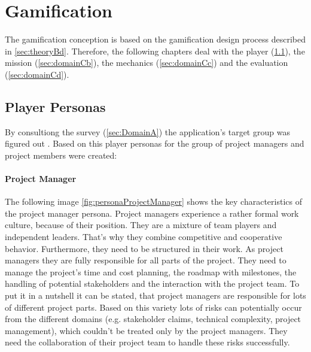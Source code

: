 \newpage

\section{Gamification}
\label{sec:domainC}


The gamification conception is based on the gamification design process described in \ref{sec:theoryBd}. Therefore, the following chapters deal with the player (\ref{sec:domainCa}), the mission (\ref{sec:domainCb}), the mechanics (\ref{sec:domainCc}) and the evaluation (\ref{sec:domainCd}).

\subsection{Player Personas}
\label{sec:domainCa}
By consultiong the survey (\ref{sec:DomainA}) the application's target group was figured out . Based on this player personas for the group of project managers and project members were created:

\paragraph*{Project Manager}

The following image \ref{fig:personaProjectManager} shows the key characteristics of the project manager persona.
Project managers experience a rather formal work culture, because of their position. They are a mixture of team players and independent leaders. That's why they combine competitive and cooperative behavior. Furthermore, they need to be structured in their work.
As project managers they are fully responsible for all parts of the project. They need to manage the project's time and cost planning, the roadmap with milestones, the handling of potential stakeholders and the interaction with the project team. To put it in a nutshell it can be stated, that project managers are responsible for lots of different project parts. Based on this variety lots of risks can potentially occur from the different domains (e.g. stakeholder claims, technical complexity, project management), which couldn't be treated only by the project managers. They need the collaboration of their project team to handle these risks successfully.

